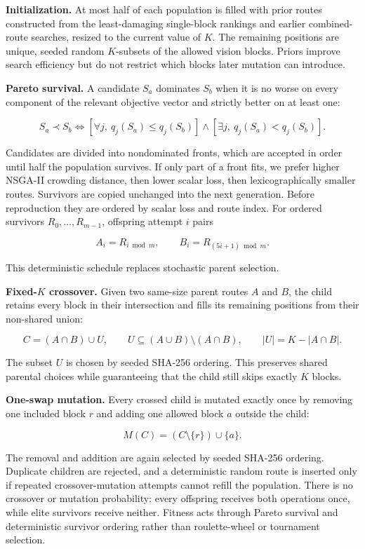 \documentclass[10pt]{article}
\begin{document}
\textbf{Initialization.} At most half of each population is filled with
prior routes constructed from the least-damaging single-block rankings
and earlier combined-route searches, resized to the current value of
\(K\). The remaining positions are unique, seeded random \(K\)-subsets
of the allowed vision blocks. Priors improve search efficiency but do
not restrict which blocks later mutation can introduce.

\textbf{Pareto survival.} A candidate \(S_a\) dominates \(S_b\) when it
is no worse on every component of the relevant objective vector and
strictly better on at least one:

\[
S_a \prec S_b \iff
\left[\forall j,\ q_j(S_a)\le q_j(S_b)\right]
\land
\left[\exists j,\ q_j(S_a)<q_j(S_b)\right].
\]

Candidates are divided into nondominated fronts, which are accepted in
order until half the population survives. If only part of a front fits,
we prefer higher NSGA-II crowding distance, then lower scalar loss, then
lexicographically smaller routes. Survivors are copied unchanged into
the next generation. Before reproduction they are ordered by scalar loss
and route index. For ordered survivors \(R_0,\ldots,R_{m-1}\), offspring
attempt \(i\) pairs

\[
A_i=R_{i\bmod m}, \qquad B_i=R_{(5i+1)\bmod m}.
\]

This deterministic schedule replaces stochastic parent selection.

\textbf{Fixed-\(K\) crossover.} Given two same-size parent routes \(A\)
and \(B\), the child retains every block in their intersection and fills
its remaining positions from their non-shared union:

\[
C=(A\cap B)\cup U, \qquad
U\subseteq(A\cup B)\setminus(A\cap B), \qquad
|U|=K-|A\cap B|.
\]

The subset \(U\) is chosen by seeded SHA-256 ordering. This preserves
shared parental choices while guaranteeing that the child still skips
exactly \(K\) blocks.

\textbf{One-swap mutation.} Every crossed child is mutated exactly once
by removing one included block \(r\) and adding one allowed block \(a\)
outside the child:

\[
M(C)=(C\setminus\{r\})\cup\{a\}.
\]

The removal and addition are again selected by seeded SHA-256 ordering.
Duplicate children are rejected, and a deterministic random route is
inserted only if repeated crossover-mutation attempts cannot refill the
population. There is no crossover or mutation probability: every
offspring receives both operations once, while elite survivors receive
neither. Fitness acts through Pareto survival and deterministic survivor
ordering rather than roulette-wheel or tournament selection.
\end{document}
